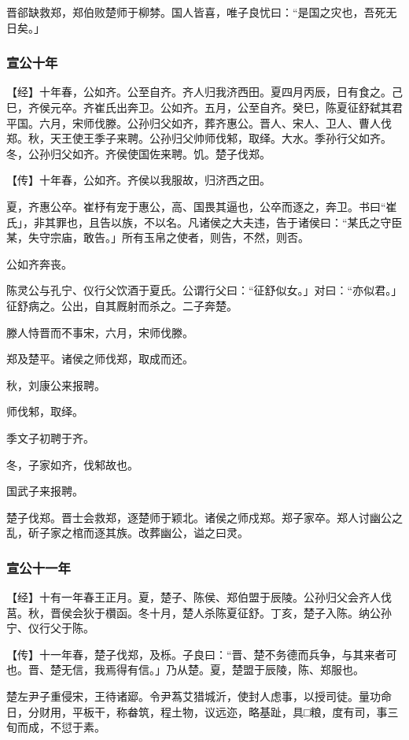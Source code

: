 \documentclass[]{article}
\begin{document}
晋郤缺救郑，郑伯败楚师于柳棼。国人皆喜，唯子良忧曰：``是国之灾也，吾死无日矣。」

\hypertarget{header-n1396}{%
\subsubsection{宣公十年}\label{header-n1396}}

【经】十年春，公如齐。公至自齐。齐人归我济西田。夏四月丙辰，日有食之。己巳，齐侯元卒。齐崔氏出奔卫。公如齐。五月，公至自齐。癸巳，陈夏征舒弑其君平国。六月，宋师伐滕。公孙归父如齐，葬齐惠公。晋人、宋人、卫人、曹人伐郑。秋，天王使王季子来聘。公孙归父帅师伐邾，取绎。大水。季孙行父如齐。冬，公孙归父如齐。齐侯使国佐来聘。饥。楚子伐郑。

【传】十年春，公如齐。齐侯以我服故，归济西之田。

夏，齐惠公卒。崔杼有宠于惠公，高、国畏其逼也，公卒而逐之，奔卫。书曰``崔氏」，非其罪也，且告以族，不以名。凡诸侯之大夫违，告于诸侯曰：``某氏之守臣某，失守宗庙，敢告。」所有玉帛之使者，则告，不然，则否。

公如齐奔丧。

陈灵公与孔宁、仪行父饮酒于夏氏。公谓行父曰：``征舒似女。」对曰：``亦似君。」征舒病之。公出，自其厩射而杀之。二子奔楚。

滕人恃晋而不事宋，六月，宋师伐滕。

郑及楚平。诸侯之师伐郑，取成而还。

秋，刘康公来报聘。

师伐邾，取绎。

季文子初聘于齐。

冬，子家如齐，伐邾故也。

国武子来报聘。

楚子伐郑。晋士会救郑，逐楚师于颖北。诸侯之师戍郑。郑子家卒。郑人讨幽公之乱，斫子家之棺而逐其族。改葬幽公，谥之曰灵。

\hypertarget{header-n1412}{%
\subsubsection{宣公十一年}\label{header-n1412}}

【经】十有一年春王正月。夏，楚子、陈侯、郑伯盟于辰陵。公孙归父会齐人伐莒。秋，晋侯会狄于欑函。冬十月，楚人杀陈夏征舒。丁亥，楚子入陈。纳公孙宁、仪行父于陈。

【传】十一年春，楚子伐郑，及栎。子良曰：``晋、楚不务德而兵争，与其来者可也。晋、楚无信，我焉得有信。」乃从楚。夏，楚盟于辰陵，陈、郑服也。

楚左尹子重侵宋，王待诸郔。令尹蒍艾猎城沂，使封人虑事，以授司徒。量功命日，分财用，平板干，称畚筑，程土物，议远迩，略基趾，具□粮，度有司，事三旬而成，不愆于素。
\end{document}
